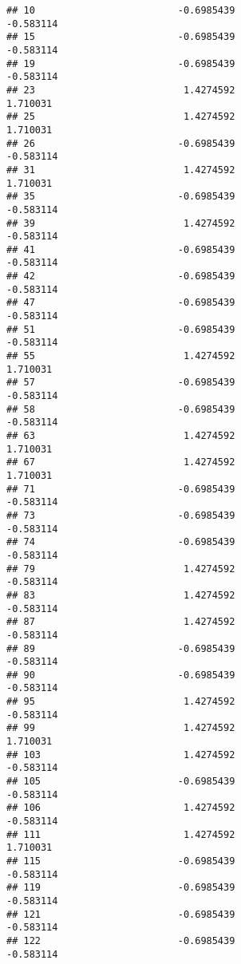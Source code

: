 \documentclass[
]{article}
\begin{document}
\begin{verbatim}
## 10                         -0.6985439                        -0.583114
## 15                         -0.6985439                        -0.583114
## 19                         -0.6985439                        -0.583114
## 23                          1.4274592                         1.710031
## 25                          1.4274592                         1.710031
## 26                         -0.6985439                        -0.583114
## 31                          1.4274592                         1.710031
## 35                         -0.6985439                        -0.583114
## 39                          1.4274592                        -0.583114
## 41                         -0.6985439                        -0.583114
## 42                         -0.6985439                        -0.583114
## 47                         -0.6985439                        -0.583114
## 51                         -0.6985439                        -0.583114
## 55                          1.4274592                         1.710031
## 57                         -0.6985439                        -0.583114
## 58                         -0.6985439                        -0.583114
## 63                          1.4274592                         1.710031
## 67                          1.4274592                         1.710031
## 71                         -0.6985439                        -0.583114
## 73                         -0.6985439                        -0.583114
## 74                         -0.6985439                        -0.583114
## 79                          1.4274592                        -0.583114
## 83                          1.4274592                        -0.583114
## 87                          1.4274592                        -0.583114
## 89                         -0.6985439                        -0.583114
## 90                         -0.6985439                        -0.583114
## 95                          1.4274592                        -0.583114
## 99                          1.4274592                         1.710031
## 103                         1.4274592                        -0.583114
## 105                        -0.6985439                        -0.583114
## 106                         1.4274592                        -0.583114
## 111                         1.4274592                         1.710031
## 115                        -0.6985439                        -0.583114
## 119                        -0.6985439                        -0.583114
## 121                        -0.6985439                        -0.583114
## 122                        -0.6985439                        -0.583114

\end{verbatim}
\end{document}
